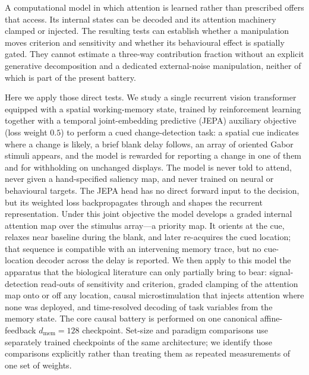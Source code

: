 A computational model in which attention is learned rather than prescribed offers
that access. Its internal states can be decoded and its attention machinery clamped
or injected. The resulting tests can establish whether a manipulation moves
criterion and sensitivity and whether its behavioural effect is spatially gated.
They cannot estimate a three-way contribution fraction without an explicit
generative decomposition and a dedicated external-noise manipulation, neither of
which is part of the present battery.

Here we apply those direct tests. We study a single recurrent vision transformer
equipped with a spatial working-memory state, trained by reinforcement learning
together with a temporal joint-embedding predictive (JEPA) auxiliary objective
(loss weight $0.5$) to
perform a cued change-detection task: a spatial cue
indicates where a change is likely, a brief blank delay follows, an array of
oriented Gabor stimuli appears, and the model is rewarded for reporting a change
in one of them and for withholding on unchanged displays. The model is never
told to attend, never given a hand-specified saliency map, and never trained on
neural or behavioural targets. The JEPA head has no direct forward input to the
decision, but its weighted loss backpropagates through and shapes the recurrent
representation. Under this joint objective the model develops a graded internal
attention map over the stimulus array---a priority map. It orients at the cue,
relaxes near baseline during the blank, and later re-acquires the cued location;
that sequence is compatible with an intervening memory trace, but no cue-location
decoder across the delay is reported. We then apply to this model the apparatus that
the biological literature can only partially bring to bear: signal-detection
read-outs of sensitivity and criterion, graded clamping of the attention map
onto or off any location, causal microstimulation that injects attention where
none was deployed, and time-resolved decoding of task variables from the memory
state. The core causal battery is performed on one canonical affine-feedback $d_{\mathrm{mem}}=128$
checkpoint. Set-size and paradigm comparisons use separately trained checkpoints of the
same architecture; we identify those comparisons explicitly rather than treating them as
repeated measurements of one set of weights.

